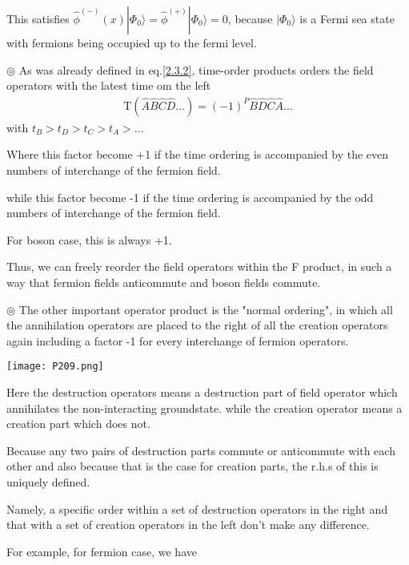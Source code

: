 This satisfies $\hat \phi^{(-)}(x)|\Phi_0\rangle=\hat \phi ^{(+)}|\Phi_0\rangle=0$, because $|\Phi_0\rangle$ is a Fermi sea state with fermions being occupied up to the fermi level.

$\circledcirc$ As was already defined in eq.\eqref{2.3.2}, time-order products orders the field operators with the latest time om the left
\begin{align}
\mathrm{T}(\hat{A}\hat{B}\hat{C}\hat{D}...)=(-1)^P\hat{B}\hat{D}\hat{C}\hat{A}... \nonumber
\end{align}
with $t_B>t_D>t_C>t_A>...$

Where this factor become +1 if the time ordering is accompanied by the even numbers of interchange of the fermion field.

while this factor become -1 if the time ordering is accompanied by the odd numbers of interchange of the fermion field.

For boson case, this is always +1.

Thus, we can freely reorder the field operators within the F product, in such a way that fermion fields anticommute and boson fields commute.

$\circledcirc$ The other important operator product is the "normal ordering", in which all the annihilation operators are placed to the right of all the creation operators again including a factor -1 for every interchange of fermion operators.
 \begin{center}
\texttt{[image: P209.png]}
\end{center}
Here the destruction operators means a destruction part of field operator which annihilates the non-interacting groundstate. while the creation operator means a creation part which does not.

Because any two pairs of destruction parts commute or anticommute with each other and also because that is the case for creation parts, the r.h.s of this is uniquely defined.

Namely, a specific order within a set of destruction operators in the right and that with a set of creation operators in the left don't make any difference.

For example, for fermion case, we have 

